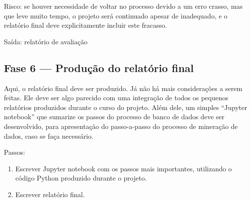 \documentclass[12pt,oneside,a4paper]{article}
\begin{document}
Risco: se houver necessidade de voltar no processo devido a um erro crasso, mas que leve muito tempo, o projeto será continuado apesar de inadequado, e o relatório final deve explicitamente incluir este fracasso.

Saída: relatório de avaliação

\subsection{Fase 6 --- Produção do relatório final}

Aqui, o relatório final deve ser produzido. Já não há mais considerações a serem feitas. Ele deve ser algo parecido com uma integração de todos os pequenos relatórios produzidos durante o curso do projeto. Além dele, um simples ``Jupyter notebook'' que sumarize os passos do processo de banco de dados deve ser desenvolvido, para apresentação do  passo-a-passo do processo de mineração de dados, caso se faça necessário.

Passos:

\begin{enumerate}
    \item Escrever Jupyter notebook com os passos mais importantes, utilizando o código Python produzido durante o projeto.
    
    \item Escrever relatório final.
\end{enumerate}




\clearpage
\end{document}
